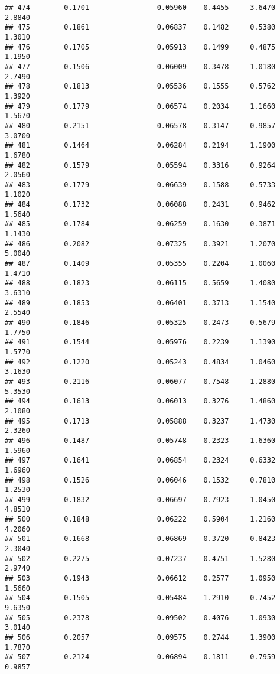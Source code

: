 \documentclass[
]{article}
\begin{document}
\begin{verbatim}
## 474        0.1701                0.05960    0.4455     3.6470       2.8840
## 475        0.1861                0.06837    0.1482     0.5380       1.3010
## 476        0.1705                0.05913    0.1499     0.4875       1.1950
## 477        0.1506                0.06009    0.3478     1.0180       2.7490
## 478        0.1813                0.05536    0.1555     0.5762       1.3920
## 479        0.1779                0.06574    0.2034     1.1660       1.5670
## 480        0.2151                0.06578    0.3147     0.9857       3.0700
## 481        0.1464                0.06284    0.2194     1.1900       1.6780
## 482        0.1579                0.05594    0.3316     0.9264       2.0560
## 483        0.1779                0.06639    0.1588     0.5733       1.1020
## 484        0.1732                0.06088    0.2431     0.9462       1.5640
## 485        0.1784                0.06259    0.1630     0.3871       1.1430
## 486        0.2082                0.07325    0.3921     1.2070       5.0040
## 487        0.1409                0.05355    0.2204     1.0060       1.4710
## 488        0.1823                0.06115    0.5659     1.4080       3.6310
## 489        0.1853                0.06401    0.3713     1.1540       2.5540
## 490        0.1846                0.05325    0.2473     0.5679       1.7750
## 491        0.1544                0.05976    0.2239     1.1390       1.5770
## 492        0.1220                0.05243    0.4834     1.0460       3.1630
## 493        0.2116                0.06077    0.7548     1.2880       5.3530
## 494        0.1613                0.06013    0.3276     1.4860       2.1080
## 495        0.1713                0.05888    0.3237     1.4730       2.3260
## 496        0.1487                0.05748    0.2323     1.6360       1.5960
## 497        0.1641                0.06854    0.2324     0.6332       1.6960
## 498        0.1526                0.06046    0.1532     0.7810       1.2530
## 499        0.1832                0.06697    0.7923     1.0450       4.8510
## 500        0.1848                0.06222    0.5904     1.2160       4.2060
## 501        0.1668                0.06869    0.3720     0.8423       2.3040
## 502        0.2275                0.07237    0.4751     1.5280       2.9740
## 503        0.1943                0.06612    0.2577     1.0950       1.5660
## 504        0.1505                0.05484    1.2910     0.7452       9.6350
## 505        0.2378                0.09502    0.4076     1.0930       3.0140
## 506        0.2057                0.09575    0.2744     1.3900       1.7870
## 507        0.2124                0.06894    0.1811     0.7959       0.9857

\end{verbatim}
\end{document}
